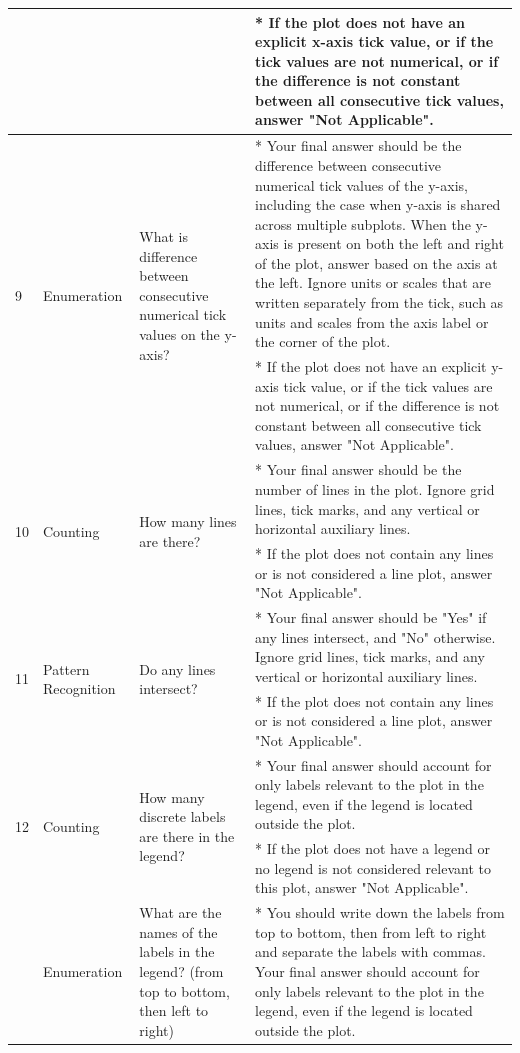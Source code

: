 \begin{longtable}{p{0.7cm}p{1.8cm}p{2cm}p{7.7cm}}
 &  &  & * If the plot does not have an explicit x-axis tick value, or if the tick values are not numerical, or if the difference is not constant between all consecutive tick values, answer "Not Applicable". \\
 \midrule
 \multirow{2}{0.7cm}{9} & \multirow{2}{1.8cm}{Enumeration} & \multirow{2}{2cm}{What is difference between consecutive numerical tick values on the y-axis?} & * Your final answer should be the difference between consecutive numerical tick values of the y-axis, including the case when y-axis is shared across multiple subplots. When the y-axis is present on both the left and right of the plot, answer based on the axis at the left. Ignore units or scales that are written separately from the tick, such as units and scales from the axis label or the corner of the plot. \\
 &  &  & * If the plot does not have an explicit y-axis tick value, or if the tick values are not numerical, or if the difference is not constant between all consecutive tick values, answer "Not Applicable". \\
 \midrule
\multirow{2}{0.7cm}{10} & \multirow{2}{1.8cm}{Counting} & \multirow{2}{2cm}{How many lines are there?} & * Your final answer should be the number of lines in the plot. Ignore grid lines, tick marks, and any vertical or horizontal auxiliary lines. \\
 &  &  & * If the plot does not contain any lines or is not considered a line plot, answer "Not Applicable". \\
 \midrule
\multirow{2}{0.7cm}{11} & \multirow{2}{1.8cm}{Pattern Recognition} & \multirow{2}{2cm}{Do any lines intersect?} & * Your final answer should be "Yes" if any lines intersect, and "No" otherwise. Ignore grid lines, tick marks, and any vertical or horizontal auxiliary lines. \\
 &  &  & * If the plot does not contain any lines or is not considered a line plot, answer "Not Applicable". \\
 \midrule
\multirow{2}{0.7cm}{12} & \multirow{2}{1.8cm}{Counting} & \multirow{2}{2cm}{How many discrete labels are there in the legend?} & * Your final answer should account for only labels relevant to the plot in the legend, even if the legend is located outside the plot. \\
 &  &  & * If the plot does not have a legend or no legend is not considered relevant to this plot, answer "Not Applicable". \\
 \midrule \newpage
\multirow{2}{0.7cm}{13} & \multirow{2}{1.8cm}{Enumeration} & \multirow{2}{2cm}{What are the names of the labels in the legend? (from top to bottom, then left to right)} & * You should write down the labels from top to bottom, then from left to right and separate the labels with commas. Your final answer should account for only labels relevant to the plot in the legend, even if the legend is located outside the plot. \\

\end{longtable}
